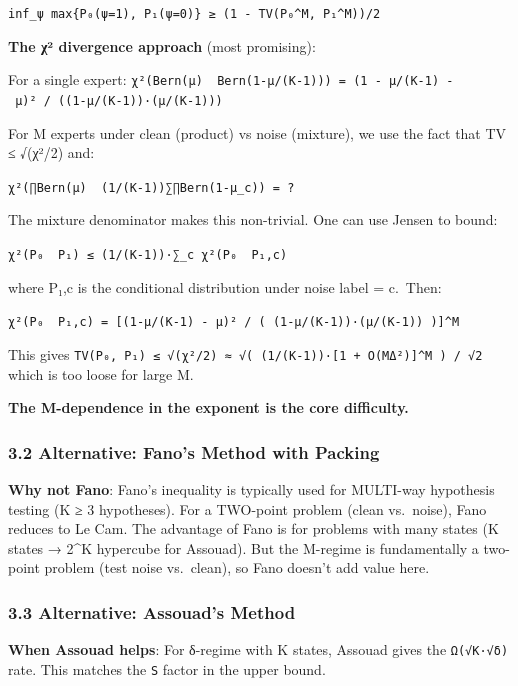 \documentclass[
  12pt,
]{article}
\begin{document}
\texttt{inf\_ψ\ max\{P₀(ψ=1),\ P₁(ψ=0)\}\ ≥\ (1\ -\ TV(P₀\^{}M,\ P₁\^{}M))/2}

\textbf{The χ² divergence approach} (most promising):

For a single expert:
\texttt{χ²(Bern(μ)\ \textbar{}\textbar{}\ Bern(1-μ/(K-1)))\ =\ (1\ -\ μ/(K-1)\ -\ μ)²\ /\ ((1-μ/(K-1))·(μ/(K-1)))}

For M experts under clean (product) vs noise (mixture), we use the fact
that TV ≤ √(χ²/2) and:

\texttt{χ²(∏Bern(μ)\ \textbar{}\textbar{}\ (1/(K-1))∑∏Bern(1-μ\_c))\ =\ ?}

The mixture denominator makes this non-trivial. One can use Jensen to
bound:

\texttt{χ²(P₀\ \textbar{}\textbar{}\ P₁)\ ≤\ (1/(K-1))·∑\_c\ χ²(P₀\ \textbar{}\textbar{}\ P₁,c)}

where P₁,c is the conditional distribution under noise label = c.~Then:

\texttt{χ²(P₀\ \textbar{}\textbar{}\ P₁,c)\ =\ {[}(1-μ/(K-1)\ -\ μ)²\ /\ (\ (1-μ/(K-1))·(μ/(K-1))\ ){]}\^{}M}

This gives
\texttt{TV(P₀,\ P₁)\ ≤\ √(χ²/2)\ ≈\ √(\ (1/(K-1))·{[}1\ +\ O(MΔ²){]}\^{}M\ )\ /\ √2}
which is too loose for large M.

\textbf{The M-dependence in the exponent is the core difficulty.}

\subsubsection{3.2 Alternative: Fano's Method with
Packing}\label{alternative-fanos-method-with-packing}

\textbf{Why not Fano}: Fano's inequality is typically used for MULTI-way
hypothesis testing (K ≥ 3 hypotheses). For a TWO-point problem (clean
vs.~noise), Fano reduces to Le Cam. The advantage of Fano is for
problems with many states (K states → 2\^{}K hypercube for Assouad). But
the M-regime is fundamentally a two-point problem (test noise
vs.~clean), so Fano doesn't add value here.

\subsubsection{3.3 Alternative: Assouad's
Method}\label{alternative-assouads-method}

\textbf{When Assouad helps}: For δ-regime with K states, Assouad gives
the \texttt{Ω(√K·√δ)} rate. This matches the
\texttt{\textbar{}S\textbar{}} factor in the upper bound.
\end{document}
